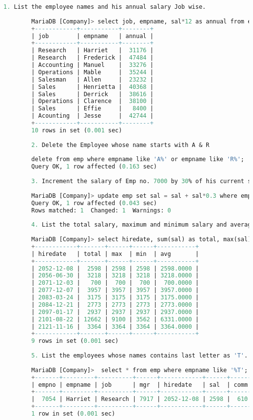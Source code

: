 \documentclass{article}
\begin{document}
	\begin{lstlisting}[language=SQL] 
		1. List the employee names and his annual salary Job wise. 
		
		MariaDB [Company]> select job, empname, sal*12 as annual from emp; 
		+------------+-----------+--------+ 
		| job        | empname   | annual | 
		+------------+-----------+--------+ 
		| Research   | Harriet   |  31176 | 
		| Research   | Frederick |  47484 | 
		| Accounting | Manuel    |  33276 | 
		| Operations | Mable     |  35244 | 
		| Salesman   | Allen     |  23232 | 
		| Sales      | Henrietta |  40368 | 
		| Sales      | Derrick   |  38616 | 
		| Operations | Clarence  |  38100 | 
		| Sales      | Effie     |   8400 | 
		| Acounting  | Jesse     |  42744 | 
		+------------+-----------+--------+ 
		10 rows in set (0.001 sec) 
		
		2. Delete the Employee whose name starts with A & R 
		
		delete from emp where empname like 'A%' or empname like 'R%'; 
		Query OK, 1 row affected (0.163 sec) 
		
		3. Increment the salary of Emp no. 7000 by 30% of his current salary. 
		
		MariaDB [Company]> update emp set sal = sal + sal*0.3 where empno = 7000; 
		Query OK, 1 row affected (0.043 sec) 
		Rows matched: 1  Changed: 1  Warnings: 0 
		
		4. List the total salary, maximum and minimum salary and average salary of the employees hire date wise. 
		
		MariaDB [Company]> select hiredate, sum(sal) as total, max(sal) as max, min(sal) as min, avg(sal) as avg from emp group by hiredate; 
		+------------+-------+------+------+-----------+ 
		| hiredate   | total | max  | min  | avg       | 
		+------------+-------+------+------+-----------+ 
		| 2052-12-08 |  2598 | 2598 | 2598 | 2598.0000 | 
		| 2056-06-30 |  3218 | 3218 | 3218 | 3218.0000 | 
		| 2071-12-03 |   700 |  700 |  700 |  700.0000 | 
		| 2077-12-07 |  3957 | 3957 | 3957 | 3957.0000 | 
		| 2083-03-24 |  3175 | 3175 | 3175 | 3175.0000 | 
		| 2084-12-21 |  2773 | 2773 | 2773 | 2773.0000 | 
		| 2097-01-17 |  2937 | 2937 | 2937 | 2937.0000 | 
		| 2101-08-22 | 12662 | 9100 | 3562 | 6331.0000 | 
		| 2121-11-16 |  3364 | 3364 | 3364 | 3364.0000 | 
		+------------+-------+------+------+-----------+ 
		9 rows in set (0.001 sec) 
		
		5. List the employees whose names contains last letter as 'T'. 
		
		MariaDB [Company]>  select * from emp where empname like '%T';  
		+-------+---------+----------+------+------------+------+------+--------+ 
		| empno | empname | job      | mgr  | hiredate   | sal  | comm | deptno | 
		+-------+---------+----------+------+------------+------+------+--------+ 
		|  7054 | Harriet | Research | 7917 | 2052-12-08 | 2598 |  610 |     20 | 
		+-------+---------+----------+------+------------+------+------+--------+ 
		1 row in set (0.001 sec) 
		

\end{lstlisting}
\end{document}
